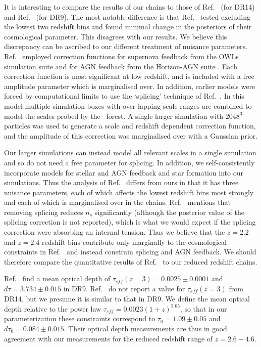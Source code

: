 It is interesting to compare the results of our chains to those of Ref.~\cite{2020JCAP...04..038P} (for DR14) and Ref.~\cite{2015JCAP...11..011P} (for DR9).
The most notable difference is that Ref.~\cite{2020JCAP...04..038P} tested excluding the lowest two redshift bins and found minimal change in the posteriors of their cosmological parameter.
This disagrees with our results.
We believe this discrepancy can be ascribed to our different treatment of nuisance parameters. Ref.~\cite{2020JCAP...04..038P} employed correction functions for supernova feedback from the OWLs simulation suite \cite{2013MNRAS.429.1734V} and for AGN feedback from the Horizon-AGN suite \cite{2020MNRAS.495.1825C}.
Each correction function is most significant at low redshift, and is included with a free amplitude parameter which is marginalised over.
In addition, earlier models were forced by computational limits to use the `splicing' technique of Ref.~\cite{2014JCAP...07..005B}.
In this model multiple simulation boxes with over-lapping scale ranges are combined to model the scales probed by the \Lya~forest.
A single larger simulation with $2048^3$ particles was used to generate a scale and redshift dependent correction function, and the amplitude of this correction was marginalised over with a Gaussian prior.

Our larger simulations can instead model all relevant scales in a single simulation and so do not need a free parameter for splicing.
In addition, we self-consistently incorporate models for stellar and AGN feedback and star formation into our simulations.
Thus the analysis of Ref.~\cite{2020JCAP...04..038P} differs from ours in that it has three nuisance parameters, each of which affects the lowest redshift bins most strongly and each of which is marginalised over in the chains.
Ref.~\cite{2015JCAP...02..045P} mentions that removing splicing reduces $n_s$ significantly (although the posterior value of the splicing correction is not reported), which is what we would expect if the splicing correction were absorbing an internal tension. 
Thus we believe that the $z=2.2$ and $z=2.4$ redshift bins contribute only marginally to the cosmological constraints in Ref.~\cite{2020JCAP...04..038P} and instead constrain splicing and AGN feedback. 
We should therefore compare the quantitative results of Ref.~\cite{2020JCAP...04..038P} to our reduced redshift chains. 

Ref.~\cite{2015JCAP...11..011P} find a mean optical depth of $\tau_{eff} (z=3) = 0.0025 \pm 0.0001$ and $d\tau = 3.734 \pm 0.015$ in DR9.
Ref.~\cite{2020JCAP...04..038P} do not report a value for $\tau_{eff}(z=3)$ from DR14, but we presume it is similar to that in DR9.
We define the mean optical depth relative to the power law $\tau_{eff} = 0.0023 (1+z)^{3.65}$, so that in our parameterization these constraints correspond to $\tau_0 = 1.09 \pm 0.05$ and $d\tau_0 = 0.084\pm 0.015$.
Their optical depth measurements are thus in good agreement with our measurements for the reduced redshift range of $z=2.6 - 4.6$. 

